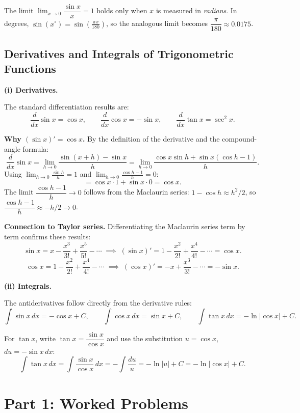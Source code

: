 \documentclass[12pt]{article}
\newenvironment{remark}[1][]{%
  \begin{remarkbox}[title={\bfseries Remark~\thetcbcounter\ifx\relax#1\relax\else\ (#1)\fi}]%
}{%
  \end{remarkbox}%
}
\begin{document}
\begin{remark}
The limit $\lim_{x\to 0}\dfrac{\sin x}{x}=1$ holds only when $x$ is measured in \emph{radians}. In degrees, $\sin(x^\circ)=\sin\!\left(\tfrac{\pi x}{180}\right)$, so the analogous limit becomes $\dfrac{\pi}{180}\approx 0.0175$.
\end{remark}

\subsection{Derivatives and Integrals of Trigonometric Functions}

\textbf{(i) Derivatives.}

The standard differentiation results are:
\[
\frac{d}{dx}\sin x = \cos x,
\qquad
\frac{d}{dx}\cos x = -\sin x,
\qquad
\frac{d}{dx}\tan x = \sec^2 x.
\]

\textbf{Why $(\sin x)' = \cos x$.}
By the definition of the derivative and the compound-angle formula:
\[
\frac{d}{dx}\sin x
= \lim_{h\to 0}\frac{\sin(x+h)-\sin x}{h}
= \lim_{h\to 0}\frac{\cos x\sin h + \sin x(\cos h - 1)}{h}.
\]
Using $\displaystyle\lim_{h\to 0}\frac{\sin h}{h}=1$ and $\displaystyle\lim_{h\to 0}\frac{\cos h-1}{h}=0$:
\[
= \cos x \cdot 1 + \sin x \cdot 0 = \cos x.
\]
The limit $\dfrac{\cos h - 1}{h} \to 0$ follows from the Maclaurin series: $1 - \cos h \approx h^2/2$, so $\dfrac{\cos h - 1}{h} \approx -h/2 \to 0$.

\textbf{Connection to Taylor series.}
Differentiating the Maclaurin series term by term confirms these results:
\[
\sin x = x - \frac{x^3}{3!} + \frac{x^5}{5!} - \cdots
\;\implies\;
(\sin x)' = 1 - \frac{x^2}{2!} + \frac{x^4}{4!} - \cdots = \cos x.
\]
\[
\cos x = 1 - \frac{x^2}{2!} + \frac{x^4}{4!} - \cdots
\;\implies\;
(\cos x)' = -x + \frac{x^3}{3!} - \cdots = -\sin x.
\]


\textbf{(ii) Integrals.}

The antiderivatives follow directly from the derivative rules:
\[
\int \sin x \, dx = -\cos x + C,
\qquad
\int \cos x \, dx = \sin x + C,
\qquad
\int \tan x \, dx = -\ln|\cos x| + C.
\]

For $\tan x$, write $\tan x = \dfrac{\sin x}{\cos x}$ and use the substitution $u = \cos x$, $du = -\sin x\,dx$:
\[
\int \tan x \, dx
= \int \frac{\sin x}{\cos x}\, dx
= -\int \frac{du}{u}
= -\ln|u|+C
= -\ln|\cos x|+C.
\]

\section{Part 1: Worked Problems}
\end{document}
